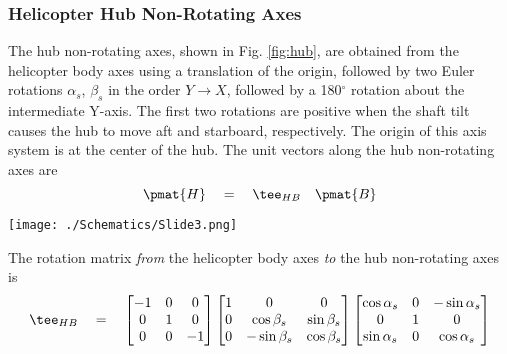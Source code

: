 \subsubsection{Helicopter Hub Non-Rotating Axes}
\label{sec:hnra}
The hub non-rotating axes, shown in Fig. \ref{fig:hub}, are obtained from the helicopter body axes using a translation of the origin, followed by two Euler rotations $\alpha_s$, $\beta_s$ in the order $Y\rightarrow X$, followed by a 180$^\circ$ rotation about the intermediate Y-axis. The first two rotations are positive when the shaft tilt causes the hub to move aft and starboard, respectively. The origin of this axis system is at the center of the hub. The unit vectors along the hub non-rotating axes are 
\begin{equation}
\pmat{H} \quad = \quad \tee_{HB} \quad \pmat{B}
\end{equation}
\begin{Figure}
 \centering
 \texttt{[image: ./Schematics/Slide3.png]}
 \vspace{-0.5cm}
 \label{fig:hub}
\end{Figure}
\vspace{0.5cm}
The rotation matrix \emph{from} the helicopter body axes \emph{to} the hub non-rotating axes is 
\begin{equation}
\label{eqn:THB}
\tee_{HB} \quad = \quad \begin{bmatrix} -1 & 0 & 0 \\ 0 & 1 & 0 \\ 0 & 0 & -1 \end{bmatrix} \begin{bmatrix} 1 & 0 & 0 \\ 0 & \cos \beta_s & \sin \beta_s \\ 0 & -\sin \beta_s & \cos \beta_s \end{bmatrix} \begin{bmatrix} \cos \alpha_s & 0 & -\sin \alpha_s \\ 0 & 1 & 0 \\ \sin \alpha_s & 0 & \cos \alpha_s \end{bmatrix}
\end{equation}
